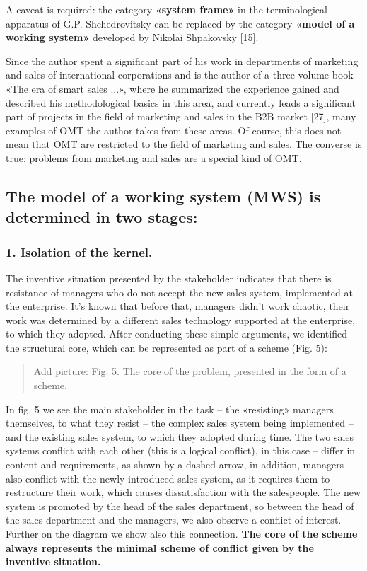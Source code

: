 \documentclass[11pt,a4paper]{book}
\newcommand{\addpicture}[1]{
  \begin{quote} Add picture: #1\end{quote}
}
\begin{document}
A caveat is required: the category \textbf{«system frame»} in the
terminological apparatus of G.P. Shchedrovitsky can be replaced by the
category \textbf{«model of a working system»} developed by Nikolai Shpakovsky
[15].

Since the author spent a significant part of his work in departments of
marketing and sales of international corporations and is the author of a
three-volume book «The era of smart sales ...», where he summarized the
experience gained and described his methodological basics in this area, and
currently leads a significant part of projects in the field of marketing and
sales in the B2B market [27], many examples of OMT the author takes from these
areas. Of course, this does not mean that OMT are restricted to the field of
marketing and sales. The converse is true: problems from marketing and sales
are a special kind of OMT.

\subsection{The model of a working system (MWS) is determined in two stages:}

\subsubsection*{1. Isolation of the kernel.}

The inventive situation presented by the stakeholder indicates that there is
resistance of managers who do not accept the new sales system, implemented at
the enterprise. It’s known that before that, managers didn’t work chaotic,
their work was determined by a different sales technology supported at the
enterprise, to which they adopted. After conducting these simple arguments, we
identified the structural core, which can be represented as part of a scheme
(Fig. 5):

\addpicture{Fig. 5. The core of the problem, presented in the form of a
  scheme.}

In fig. 5 we see the main stakeholder in the task -- the «resisting» managers
themselves, to what they resist -- the complex sales system being implemented
-- and the existing sales system, to which they adopted during time.  The two
sales systems conflict with each other (this is a logical conflict), in this
case -- differ in content and requirements, as shown by a dashed arrow, in
addition, managers also conflict with the newly introduced sales system, as it
requires them to restructure their work, which causes dissatisfaction with the
salespeople.  The new system is promoted by the head of the sales department,
so between the head of the sales department and the managers, we also observe
a conflict of interest. Further on the diagram we show also this connection.
\textbf{The core of the scheme always represents the minimal scheme of
  conflict given by the inventive situation.}
\end{document}
